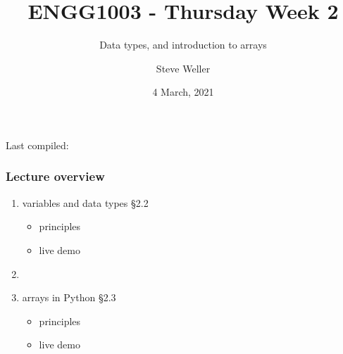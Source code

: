 \documentclass[english,14pt]{beamer}
\title{ENGG1003 - Thursday Week 2}
\subtitle{Data types, and introduction to arrays}
\author{Steve Weller}
\institute{University of Newcastle}
\date{4 March, 2021}
\newcommand\red[1]{{\color{red} #1}}
\begin{document}
\begin{flushleft}
{\scriptsize Last compiled:~\DTMnow}
\vspace*{-5mm}
\end{flushleft}
\framebreak


\begin{frame}[fragile]

\frametitle{Lecture overview}
\begin{enumerate}
	\item variables and data types \red{\S2.2}
	\begin{itemize}
		\item principles
		\item live demo
	\end{itemize}

	\item[]
	
	\item arrays in Python \red{\S2.3}
		\begin{itemize}
			\item principles
			\item live demo
		\end{itemize}

\end{enumerate}

\end{frame}

\end{document}
